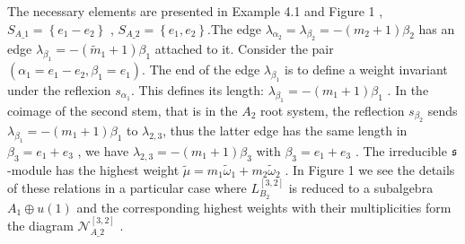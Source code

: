 \documentclass[12pt]{article}
\begin{document}
The necessary elements are presented in Example 4.1 and Figure 1 , $%
S_{A\_1}=\left\{ e_{1}-e_{2}\right\} $ , $S_{A\_2}=\left\{
e_{1},e_{2}\right\} $.The edge $\lambda _{\alpha _{2}}=\lambda
_{\beta _{2}}=-\left( m_{2}+1\right) \beta _{2}$ has an edge
$\lambda _{\beta _{1}}=-\left( \widetilde{m}_{1}+1\right) \beta
_{1}$ attached to it. Consider the pair $\left( \alpha
_{1}=e_{1}-e_{2},\beta _{1}=e_{1}\right).$ The end of the edge
$\lambda _{\beta _{1}}$ is to define a weight
invariant under the reflexion $s_{\alpha _{1}}.$ This defines its length: $%
\lambda _{\beta _{1}}=-\left( m_{1}+1\right) \beta _{1}$ . In the
coimage of
the second stem, that is in the $A_{2}$ root system, the reflection $%
s_{\beta _{2}}$ sends $\lambda _{\beta _{1}}=-\left(
m_{1}+1\right) \beta
_{1}$ to $\lambda _{2,3}$, thus the latter edge has the same length in $%
\beta _{3}=e_{1}+e_{3}$ , we have $\lambda _{2,3}=-\left(
m_{1}+1\right)
\beta _{3}$ with $\beta _{3}=e_{1}+e_{3}$ . The irreducible $\frak{s}$%
-module has the highest weight $\widetilde{\mu }=m_{1}\widetilde{\omega }%
_{1}+m_{2}\widetilde{\omega }_{2}$ . In Figure 1 we see the
details of these relations in a particular case where
$L_{B_{2}}^{\left[ 3,2\right] }$ is reduced to a subalgebra
$A_{1}\oplus u\left( 1\right) $ and the
corresponding highest weights with their multiplicities form the diagram $%
\mathcal{N}_{A\_2}^{\left[ 3,2\right] }$ .


\end{document}
